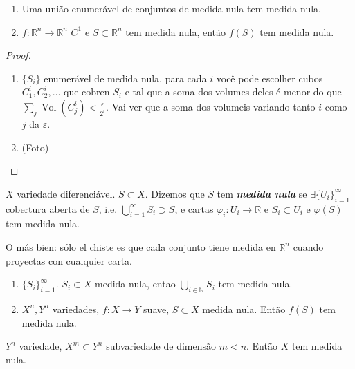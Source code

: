 \begin{prop}\leavevmode
	\begin{enumerate}
	\item Uma união enumerável de conjuntos de medida nula tem medida nula.
	\item \(f : \mathbb{R}^n \to \mathbb{R}^n\) \(C^1\) e \(S \subset \mathbb{R}^n\) tem medida nula, então \(f(S)\) tem medida nula.
	\end{enumerate}
\end{prop}

\begin{proof}\leavevmode
\begin{enumerate}
\item \(\{S_i\}\) enumerável de medida nula, para cada $i$ você pode escolher cubos \(C^i_1,C^i_2,\ldots\) que cobren \(S_i\) e tal que a soma dos volumes deles é menor do que \(\sum_j \operatorname{Vol}(C^i_j)<\frac{\varepsilon}{2^i}\). Vai ver que a soma dos volumeis variando tanto \(i\) como \(j\) da \(\varepsilon\).

\item (Foto)
\end{enumerate}
\end{proof}

\begin{defn}\leavevmode
	\(X\) variedade diferenciável. \(S \subset X\). Dizemos que \(S\) tem \textit{\textbf{medida nula}} se \(\exists \{U_i\}_{i=1}^\infty\) cobertura aberta de \(S\), i.e. \(\bigcup_{i=1}^\infty S_i \supset S\), e cartas \(\varphi_i:U_i\to \mathbb{R}\) e \(S_i \subset U_i\) e \(\varphi(S)\) tem medida nula.

	O más bien: sólo el chiste es que cada conjunto tiene medida en \(\mathbb{R}^n\) cuando proyectas con cualquier carta.
\end{defn}

\begin{coro}\leavevmode
	\begin{enumerate}
	\item \(\{S_i\}_{i=1}^\infty\).  \(S_i \subset X\) medida nula, entao \(\bigcup_{i \in \mathbb{N}}S_i\) tem medida nula.
	\item \(X^n, Y^n\) variedades, \(f:X \to Y\) suave, \(S \subset X\) medida nula. Então \(f(S)\) tem medida nula.
	\end{enumerate}
\end{coro}

\begin{prop}\leavevmode
\(Y^n\) variedade, \(X^m \subset Y^n\) subvariedade de dimensão \(m <n\). Então \(X\) tem medida nula.
\end{prop}

